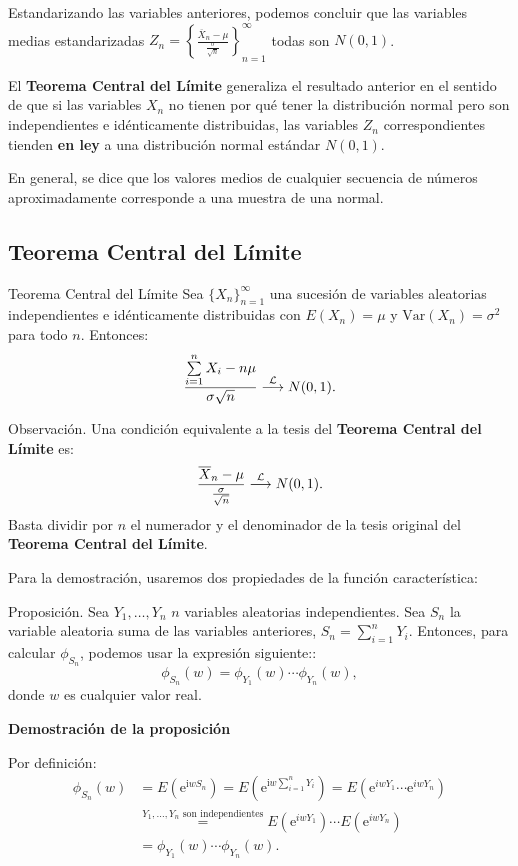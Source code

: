 \documentclass[]{book}
\begin{document}
Estandarizando las variables anteriores, podemos concluir que las variables medias estandarizadas \(Z_n =\left\{\frac{\overline{X}_n-\mu}{\frac{\sigma}{\sqrt{n}}}\right\}_{n=1}^\infty\) todas son \(N(0,1)\).

El \textbf{Teorema Central del Límite} generaliza el resultado anterior en el sentido de que si las variables \(X_n\) no tienen por qué tener la distribución normal pero son independientes e idénticamente distribuidas, las variables \(Z_n\) correspondientes tienden \textbf{en ley} a una distribución normal estándar \(N(0,1)\).

En general, se dice que los valores medios de cualquier secuencia de números aproximadamente corresponde a una muestra de una normal.

\hypertarget{teorema-central-del-luxedmite-1}{%
\subsection{Teorema Central del Límite}\label{teorema-central-del-luxedmite-1}}

Teorema Central del Límite
Sea \(\{X_n\}_{n=1}^\infty\) una sucesión de variables aleatorias independientes e idénticamente distribuidas con \(E(X_n)=\mu\) y \(\mathrm{Var}(X_n)=\sigma^2\) para todo \(n\). Entonces:
\[
\frac{\sum\limits_{i=1}^n X_i-n\mu}{\sigma\sqrt{n}}\stackrel{{\cal L}}{\longrightarrow} N(0,1).
\]

Observación.
Una condición equivalente a la tesis del \textbf{Teorema Central del Límite} es:
\[
\frac{\overline{X}_n-\mu}{\frac{\sigma}{\sqrt{n}}}\stackrel{{\cal L}}{\longrightarrow} N(0,1).
\]
Basta dividir por \(n\) el numerador y el denominador de la tesis original del \textbf{Teorema Central del Límite}.

Para la demostración, usaremos dos propiedades de la función característica:

Proposición.
Sea \(Y_1,\ldots, Y_n\) \(n\) variables aleatorias independientes. Sea \(S_n\) la variable aleatoria suma de las variables anteriores, \(S_n=\sum\limits_{i=1}^n Y_i\). Entonces, para calcular \(\phi_{S_n}\), podemos usar la expresión siguiente::
\[
\phi_{S_n}(w)=\phi_{Y_1}(w)\cdots \phi_{Y_n}(w),
\]
donde \(w\) es cualquier valor real.

\textbf{Demostración de la proposición}

Por definición:
\[
\begin{array}{rl}
\phi_{S_n}(w) & =E\left(\mathrm{e}^{\mathrm{i} w S_n}\right)=E\left(\mathrm{e}^{\mathrm{i} w \sum\limits_{i=1}^n Y_i}\right) = E\left(\mathrm{e}^{i w Y_1}\cdots \mathrm{e}^{i w Y_n}\right)\\ & \stackrel{\mbox{$Y_1,\ldots,Y_n$ son independientes}}{=} E\left(\mathrm{e}^{i w Y_1}\right)\cdots E\left(\mathrm{e}^{i w Y_n}\right) \\
& =\phi_{Y_1}(w)\cdots \phi_{Y_n}(w).
\end{array}
\]
\end{document}

